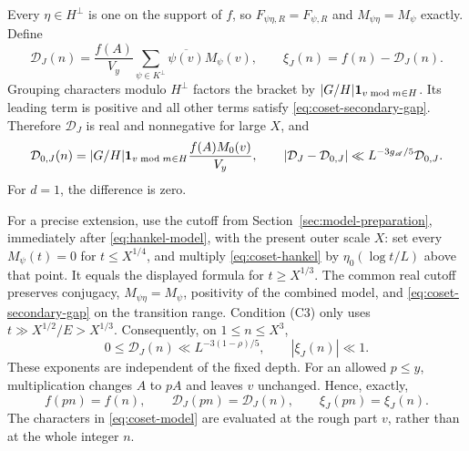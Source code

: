 Every \(\eta\in H^\perp\) is one on the support of \(f\), so
\(F_{\psi\eta,R}=F_{\psi,R}\) and \(M_{\psi\eta}=M_\psi\)
exactly. Define
\begin{equation}\label{eq:coset-model}
 \mathcal D_J(n)=\frac{f(A)}{V_y}
              \sum_{\psi\in K^\perp}\overline{\psi(v)}M_\psi(v),
 \qquad \xi_J(n)=f(n)-\mathcal D_J(n).
\end{equation}
Grouping characters modulo \(H^\perp\) factors the bracket by
\(|G/H|\mathbf 1_{v\bmod m\in H}\). Its leading term is positive and
all other terms satisfy \eqref{eq:coset-secondary-gap}. Therefore
\(\mathcal D_J\) is real and nonnegative for large \(X\), and
\begin{equation}\label{eq:coset-model-domination}
 \mathcal D_{0,J}(n)=|G/H|\mathbf 1_{v\bmod m\in H}\frac{f(A)M_0(v)}{V_y},
 \qquad |\mathcal D_J-\mathcal D_{0,J}|\ll L^{-3g_{\mathscr A}/5}\mathcal D_{0,J}.
\end{equation}
For \(d=1\), the difference is zero.

For a precise extension, use the cutoff from
Section~\ref{sec:model-preparation}, immediately after
\eqref{eq:hankel-model}, with the present outer scale \(X\):
set every \(M_\psi(t)=0\) for \(t\le X^{1/4}\), and multiply
\eqref{eq:coset-hankel} by \(\eta_0(\log t/L)\) above that point.
It equals the displayed formula for \(t\ge X^{1/3}\).
The common real cutoff preserves conjugacy,
\(M_{\psi\eta}=M_\psi\), positivity of the combined model,
and \eqref{eq:coset-secondary-gap} on the transition range.
Condition (C3) only uses \(t\gg X^{1/2}/E>X^{1/3}\).
Consequently, on
\(1\le n\le X^3\),
\[
 0\le \mathcal D_J(n)\ll L^{-3(1-\rho)/5},\qquad |\xi_J(n)|\ll1.
\]
These exponents are independent of the fixed depth. For an allowed
\(p\le y\), multiplication changes \(A\) to \(pA\) and leaves
\(v\) unchanged. Hence, exactly,
\begin{equation}\label{eq:coset-invariance}
 f(pn)=f(n),\qquad \mathcal D_J(pn)=\mathcal D_J(n),\qquad \xi_J(pn)=\xi_J(n).
\end{equation}
The characters in \eqref{eq:coset-model} are evaluated at the rough
part \(v\), rather than at the whole integer \(n\).

